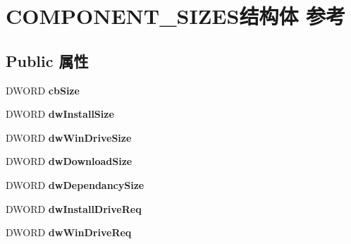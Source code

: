 \hypertarget{struct_c_o_m_p_o_n_e_n_t___s_i_z_e_s}{}\section{C\+O\+M\+P\+O\+N\+E\+N\+T\+\_\+\+S\+I\+Z\+E\+S结构体 参考}
\label{struct_c_o_m_p_o_n_e_n_t___s_i_z_e_s}
\subsection*{Public 属性}
\begin{DoxyCompactItemize}
\item 
\mbox{\label{struct_c_o_m_p_o_n_e_n_t___s_i_z_e_s_a0a0d95348cfa8b00f0ba60356106b820}} 
D\+W\+O\+RD {\bfseries cb\+Size}
\item 
\mbox{\label{struct_c_o_m_p_o_n_e_n_t___s_i_z_e_s_ac1c76e0dc6aae308e40f8fc0e2721700}} 
D\+W\+O\+RD {\bfseries dw\+Install\+Size}
\item 
\mbox{\label{struct_c_o_m_p_o_n_e_n_t___s_i_z_e_s_a13a83e00ba7bf7410c8714fda717c6c4}} 
D\+W\+O\+RD {\bfseries dw\+Win\+Drive\+Size}
\item 
\mbox{\label{struct_c_o_m_p_o_n_e_n_t___s_i_z_e_s_a2cfadae0d1d866c094d66137dc5ff74c}} 
D\+W\+O\+RD {\bfseries dw\+Download\+Size}
\item 
\mbox{\label{struct_c_o_m_p_o_n_e_n_t___s_i_z_e_s_a04dbfe32faad0871349bc767904fa6cf}} 
D\+W\+O\+RD {\bfseries dw\+Dependancy\+Size}
\item 
\mbox{\label{struct_c_o_m_p_o_n_e_n_t___s_i_z_e_s_ae3543d1959b62f458da6fb8ae13bbb2a}} 
D\+W\+O\+RD {\bfseries dw\+Install\+Drive\+Req}
\item 
\mbox{\label{struct_c_o_m_p_o_n_e_n_t___s_i_z_e_s_a30e91834fbaa351f18dde6f82f76750b}} 
D\+W\+O\+RD {\bfseries dw\+Win\+Drive\+Req}
\item 
\mbox{\label{struct_c_o_m_p_o_n_e_n_t___s_i_z_e_s_ad1e4de640fc05576c6fb833cb8c2ecfa}} 

\end{DoxyCompactItemize}
